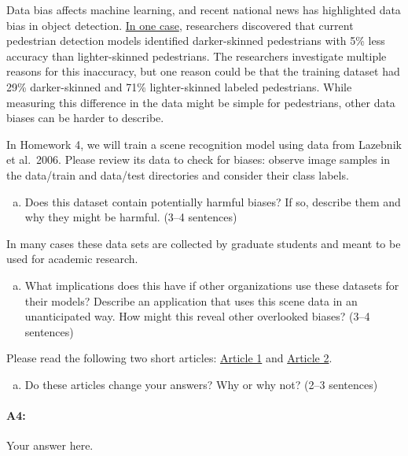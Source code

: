Data bias affects machine learning, and recent national news has highlighted data bias in object detection. \href{https://www.vox.com/future-perfect/2019/3/5/18251924/self-driving-car-racial-bias-study-autonomous-vehicle-dark-skin}{In one case}, researchers discovered that current pedestrian detection models identified darker-skinned pedestrians with 5\% less accuracy than lighter-skinned pedestrians. The researchers investigate multiple reasons for this inaccuracy, but one reason could be that the training dataset had 29\% darker-skinned and 71\% lighter-skinned labeled pedestrians. While measuring this difference in the data might be simple for pedestrians, other data biases can be harder to describe.

In Homework 4, we will train a scene recognition model using data from Lazebnik et al.~2006. Please review its data to check for biases: observe image samples in the data/train and data/test directories and consider their class labels.

\begin{enumerate}[(a)]
\item Does this dataset contain potentially harmful biases? If so, describe them and why they might be harmful. (3--4 sentences)
\end{enumerate}

 In many cases these data sets are collected by graduate students and meant to be used for academic research. 

\begin{enumerate}[(b)]
\item What implications does this have if other organizations use these datasets for their models? Describe an application that uses this scene data in an unanticipated way. How might this reveal other overlooked biases? (3--4 sentences)
\end{enumerate}

Please read the following two short articles: \href{https://www.theverge.com/2019/6/11/18661128/ai-object-recognition-algorithms-bias-worse-household-items-lower-income-countries}{Article 1} and \href{https://arxiv.org/pdf/1711.08536.pdf}{Article 2}.

\begin{enumerate}[(c)]
\item Do these articles change your answers? Why or why not? (2--3 sentences)
\end{enumerate}


\pagebreak
\paragraph{A4:} Your answer here.

